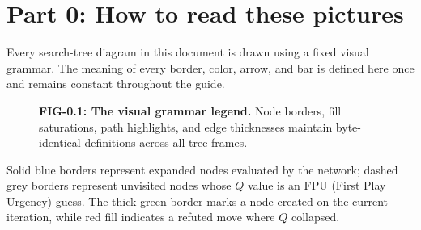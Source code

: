 \chapter*{Part 0: How to read these pictures}

Every search-tree diagram in this document is drawn using a fixed visual grammar. The meaning of every border, color, arrow, and bar is defined here once and remains constant throughout the guide.

\begin{figure}[htbp]
\centering

\caption{\textbf{FIG-0.1: The visual grammar legend.} Node borders, fill saturations, path highlights, and edge thicknesses maintain byte-identical definitions across all tree frames.}
\label{fig:0_1}
\end{figure}

\begin{keyidea}
Solid blue borders represent expanded nodes evaluated by the network; dashed grey borders represent unvisited nodes whose $Q$ value is an FPU (First Play Urgency) guess. The thick green border marks a node created on the current iteration, while red fill indicates a refuted move where $Q$ collapsed.
\end{keyidea}
